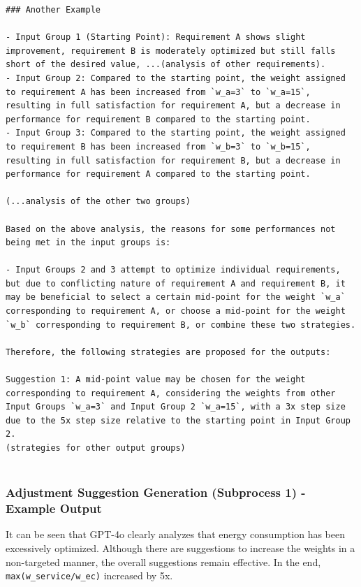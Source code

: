 \documentclass{article}
\begin{document}
\begin{verbatim}
### Another Example

- Input Group 1 (Starting Point): Requirement A shows slight improvement, requirement B is moderately optimized but still falls short of the desired value, ...(analysis of other requirements).
- Input Group 2: Compared to the starting point, the weight assigned to requirement A has been increased from `w_a=3` to `w_a=15`, resulting in full satisfaction for requirement A, but a decrease in performance for requirement B compared to the starting point.
- Input Group 3: Compared to the starting point, the weight assigned to requirement B has been increased from `w_b=3` to `w_b=15`, resulting in full satisfaction for requirement B, but a decrease in performance for requirement A compared to the starting point.

(...analysis of the other two groups)

Based on the above analysis, the reasons for some performances not being met in the input groups is:

- Input Groups 2 and 3 attempt to optimize individual requirements, but due to conflicting nature of requirement A and requirement B, it may be beneficial to select a certain mid-point for the weight `w_a` corresponding to requirement A, or choose a mid-point for the weight `w_b` corresponding to requirement B, or combine these two strategies.

Therefore, the following strategies are proposed for the outputs:

Suggestion 1: A mid-point value may be chosen for the weight corresponding to requirement A, considering the weights from other Input Groups `w_a=3` and Input Group 2 `w_a=15`, with a 3x step size due to the 5x step size relative to the starting point in Input Group 2.
(strategies for other output groups)


\end{verbatim}


\subsubsection{Adjustment Suggestion Generation (Subprocess 1) - Example Output}
It can be seen that GPT-4o clearly analyzes that energy consumption has been excessively optimized. Although there are suggestions to increase the weights in a non-targeted manner, the overall suggestions remain effective. In the end, \verb|max(w_service/w_ec)| increased by 5x.
\end{document}
